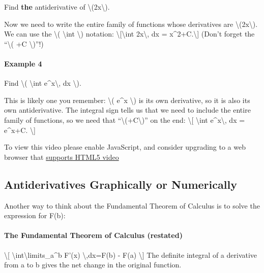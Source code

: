 Find \textbf{the} antiderivative of
\textbackslash{}(2x\textbackslash{}).

Now we need to write the entire family of functions whose derivatives
are \textbackslash{}(2x\textbackslash{}). We can use the
\textbackslash{}( \textbackslash{}int \textbackslash{}) notation:
\textbackslash{}{[}\textbackslash{}int 2x\textbackslash{}, dx =
x\^{}2+C.\textbackslash{}{]} (Don't forget the ``\textbackslash{}( +C
\textbackslash{})''!)

\hypertarget{example-4}{%
\paragraph{Example 4}\label{example-4}}

Find \textbackslash{}( \textbackslash{}int e\^{}x\textbackslash{}, dx
\textbackslash{}).

This is likely one you remember: \textbackslash{}( e\^{}x
\textbackslash{}) is its own derivative, so it is also its own
antiderivative. The integral sign tells us that we need to include the
entire family of functions, so we need that
``\textbackslash{}(+C\textbackslash{})'' on the end: \textbackslash{}{[}
\textbackslash{}int e\^{}x\textbackslash{}, dx = e\^{}x+C.
\textbackslash{}{]}

To view this video please enable JavaScript, and consider upgrading to a
web browser that \href{http://videojs.com/html5-video-support/}{supports
HTML5 video}

\hypertarget{antiderivatives-graphically-or-numerically}{%
\subsection{Antiderivatives Graphically or
Numerically}\label{antiderivatives-graphically-or-numerically}}

Another way to think about the Fundamental Theorem of Calculus is to
solve the expression for F(b):

\hypertarget{the-fundamental-theorem-of-calculus-restated}{%
\paragraph{The Fundamental Theorem of Calculus
(restated)}\label{the-fundamental-theorem-of-calculus-restated}}

\textbackslash{}{[} \textbackslash{}int\textbackslash{}limits\_a\^{}b
F'(x) \textbackslash{},dx=F(b) - F(a) \textbackslash{}{]} The definite
integral of a derivative from a to b gives the net change in the
original function.

